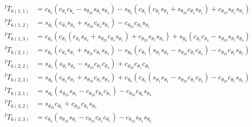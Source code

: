 \[
\begin{aligned}
^IT_{6(1,1)} &=
c_{\theta_6}(c_{\theta_1}c_{\theta_4} - s_{\theta_{23}}s_{\theta_1}s_{\theta_4}) - s_{\theta_6}(c_{\theta_5}(c_{\theta_1}s_{\theta_4} + s_{\theta_{23}}c_{\theta_4}s_{\theta_1}) + c_{\theta_{23}}s_{\theta_1}s_{\theta_5})\\
^IT_{6(1,2)} &=
s_{\theta_5}(c_{\theta_1}s_{\theta_4} + s_{\theta_{23}}c_{\theta_4}s_{\theta_1}) - c_{\theta_{23}}c_{\theta_5}s_{\theta_1}\\
^IT_{6(1,3)} &=
c_{\theta_6}(c_{\theta_5}(c_{\theta_1}s_{\theta_4} + s_{\theta_{23}}c_{\theta_4}s_{\theta_1}) + c_{\theta_{23}}s_{\theta_1}s_{\theta_5}) + s_{\theta_6}(c_{\theta_1}c_{\theta_4} - s_{\theta_{23}}s_{\theta_1}s_{\theta_4})\\
^IT_{6(2,1)} &=
c_{\theta_6}(c_{\theta_4}s_{\theta_1} + s_{\theta_{23}}c_{\theta_1}s_{\theta_4}) - s_{\theta_6}(c_{\theta_5}(s_{\theta_1}s_{\theta_4} - s_{\theta_{23}}c_{\theta_1}c_{\theta_4}) - c_{\theta_{23}}c_{\theta_1}s_{\theta_5})\\
^IT_{6(2,2)} &=
s_{\theta_5}(s_{\theta_1}s_{\theta_4} - s_{\theta_{23}}c_{\theta_1}c_{\theta_4}) + c_{\theta_{23}}c_{\theta_1}c_{\theta_5}\\
^IT_{6(2,3)} &=
s_{\theta_6}(c_{\theta_4}s_{\theta_1} + s_{\theta_{23}}c_{\theta_1}s_{\theta_4}) + c_{\theta_6}(c_{\theta_5}(s_{\theta_1}s_{\theta_4} - s_{\theta_{23}}c_{\theta_1}c_{\theta_4}) - c_{\theta_{23}}c_{\theta_1}s_{\theta_5})\\
^IT_{6(3,1)} &=
s_{\theta_6}(s_{\theta_{23}}s_{\theta_5} - c_{\theta_{23}}c_{\theta_4}c_{\theta_5}) - c_{\theta_{23}}c_{\theta_6}s_{\theta_4}\\
^IT_{6(3,2)} &=
s_{\theta_{23}}c_{\theta_5} + c_{\theta_{23}}c_{\theta_4}s_{\theta_5}\\
^IT_{6(3,3)} &=
c_{\theta_6}(s_{\theta_{23}}s_{\theta_5} - c_{\theta_{23}}c_{\theta_4}c_{\theta_5}) - c_{\theta_{23}}s_{\theta_4}s_{\theta_6}
\end{aligned}
\]
